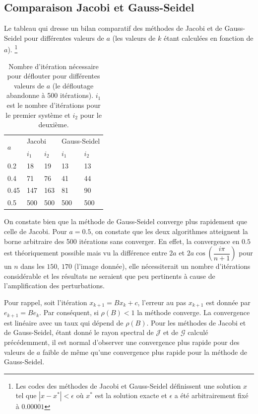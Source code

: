 \subsection{Comparaison Jacobi et Gauss-Seidel}
Le tableau qui dresse un bilan comparatif des méthodes de Jacobi et de Gauss-Seidel pour différentes valeurs de $a$ (les valeurs de $k$ étant calculées en fonction de $a$).
\footnote{Les codes des méthodes de Jacobi et Gauss-Seidel définissent une solution $x$
tel que $|x-x^*|<\epsilon$ où $x^*$ est la solution exacte et $\epsilon$ a été arbitrairement fixé à $0.00001$}
\begin{table}
  \centering
  \begin{tabular}{|l|l|l|l|l|}
    \hline
    \multirow{2}{*}{$a$} & \multicolumn{2}{l|}{Jacobi} & \multicolumn{2}{l|}{Gauss-Seidel}\\
    \cline{2-5}
        & $i_1$ & $i_2$ & $i_1$ & $i_2$\\
    \hline
    0.2 & 18    & 19    & 13    & 13\\
    \hline
    0.4 & 71    & 76    & 41    & 44\\
    \hline
    0.45& 147   & 163   & 81    & 90\\
    \hline
    0.5 & 500   & 500   & 500   & 500\\
    \hline
  \end{tabular}
  \caption{Nombre d'itération nécessaire pour déflouter pour différentes valeurs de $a$ (le défloutage abandonne à 500 itérations).
  $i_1$ est le nombre d'itérations pour le premier système et $i_2$ pour le deuxième.}
  \label{tab:iter}
\end{table}
On constate bien que la méthode de Gauss-Seidel converge plus rapidement que celle de Jacobi. Pour $a=0.5$, on constate que les deux algorithmes atteignent la borne arbitraire des 500 itérations sans converger. En effet, la convergence en $0.5$ est théoriquement possible mais vu la différence entre $2a$ et $2a \cos(\dfrac{i \pi}{n+1})$ pour un $n$ dans les $150$, $170$ (l'image donnée), elle nécessiterait un nombre d'itérations considérable et les résultats ne seraient que peu pertinents à cause de l'amplification des perturbations. %

Pour rappel, soit l'itération $x_{k+1} = B x_k + c$,
l'erreur au pas $x_{k+1}$ est donnée par $e_{k+1} = B e_k $. Par conséquent, si $\rho (B)<1$ la méthode converge. La convergence est linéaire avec un taux qui dépend de $\rho(B)$. Pour les méthodes de Jacobi et de Gauss-Seidel, étant donné le rayon spectral de $\mathcal{J}$ et de $\mathcal{G}$ calculé précédemment, il est normal d'observer une convergence plus rapide pour des valeurs de $a$ faible de même qu'une convergence plus rapide pour la méthode de Gauss-Seidel. 



